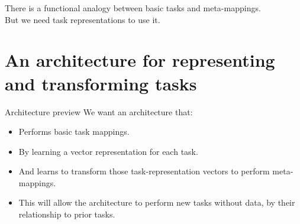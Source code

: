 \documentclass{beamer}
\begin{document}
\begin{frame}[standout]
There is a functional analogy between basic tasks and meta-mappings. \\[1em]
But we need task representations to use it. 
\end{frame}

\section{An architecture for representing and transforming tasks}

\begin{frame}{Architecture preview}
We want an architecture that:
\begin{itemize}[<+->]
\item Performs basic task mappings.
\item By learning a vector representation for each task.
\item And learns to transform those task-representation vectors to perform meta-mappings.
\item This will allow the architecture to perform new tasks without data, by their relationship to prior tasks.
\end{itemize}
\end{frame}
\end{document}
